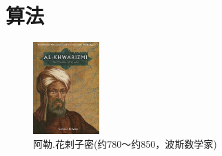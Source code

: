 \section{算法}

\begin{frame}
      
\end{frame}

\begin{frame}
   
  \pause 
  \begin{figure}
    \includegraphics[width=1in]{Chapters/Ch01/Fig/Hualazimi}
    \caption{阿勒.花剌子密(约780～约850，波斯数学家)}
  \end{figure}
\end{frame}

\begin{frame}
      
  
\end{frame}


\begin{frame}
      
  
\end{frame}

\begin{frame}
      
  
\end{frame}

\begin{frame}
      
  
\end{frame}

\begin{frame}
      
  
\end{frame}

\begin{frame}
      
\end{frame}

\begin{frame}
      
  
\end{frame}

